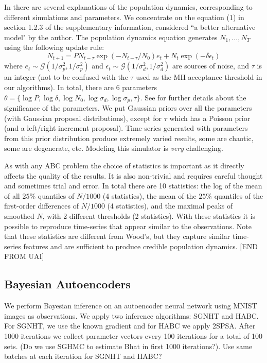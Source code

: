 \documentclass[]{article}
\begin{document}
In \cite{wood2010statistical} there are several explanations of the population dynamics, corresponding to different simulations and parameters.  We concentrate on the equation (1) in section 1.2.3 of the supplementary information, considered ``a better alternative model" by the author.  The population dynamics equation generates  $N_1, \ldots, N_T$ using the following update rule:
\begin{equation}
N_{t+1} = P N_{t-\tau} \exp(-N_{t-\tau}/N_0) e_t + N_t \exp(-\delta \epsilon_t) \nonumber
\end{equation}
where $e_t \sim  \mathcal{G}( 1/{\sigma_p^2},1/{\sigma_p^2})$ and $\epsilon_t 
 \sim  \mathcal{G}( 1/{\sigma_d^2},1/{\sigma_d^2})$  
are sources of noise, and $\tau$ is an integer (not to be confused with the $\tau$ used as the MH acceptance threshold in our algorithms).  In total, there are 6 parameters $\theta = \{ \log P, \log \delta, \log N_0, \log \sigma_d, \log \sigma_p, \tau\}$.  See \cite{wood2010statistical} for further details about the significance of the parameters.  We put Gaussian priors over all the parameters (with Gaussian proposal distributions), except for $\tau$ which has a Poisson prior (and a left/right increment proposal). Time-series generated with parameters from this prior distribution produce extremely varied results, some are chaotic, some are degenerate, etc.  Modeling this simulator is {\em very} challenging.

As with any ABC problem the choice of statistics is important as it directly affects the quality of the results.   It is also non-trivial and requires careful thought and sometimes trial and error.   In total there are 10 statistics: the log of the mean of all $25\%$ quantiles of $N/1000$ (4 statistics), the mean of the $25\%$ quantiles of the first-order differences of $N/1000$ (4 statistics), and the maximal peaks of smoothed $N$, with 2 different thresholds (2 statistics).    With these statistics it is possible to reproduce time-series that appear similar to the observations.  Note that these statistics are different from Wood's, but they capture similar time-series features and are sufficient to produce credible population dynamics. [END FROM UAI]


\subsection{Bayesian Autoencoders}\label{sec:auto}
We perform Bayesian inference on an autoencoder neural network using MNIST images as observations.  We apply two inference algorithms: SGNHT and HABC.  For SGNHT, we use the known gradient and for HABC we apply 2SPSA.  After 1000 iterations we collect parameter vectors every 100 iterations for a total of 100 sets. (Do we use SGHMC to estimate Bhat in first 1000 iterations?).  Use same batches at each iteration for SGNHT and HABC? 
\end{document}
